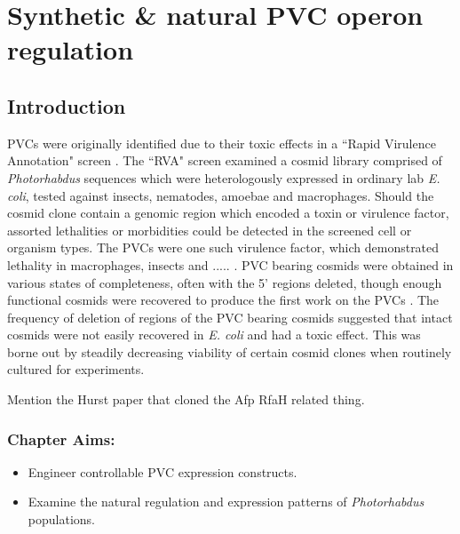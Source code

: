 \pagestyle{IHA-fancy-style}


\chapter{Synthetic \& natural PVC operon regulation}\label{regulation}

\section{Introduction}
PVCs were originally identified due to their toxic effects in a ``Rapid Virulence Annotation" screen \citep{Waterfield2008, Yang2006}. The ``RVA" screen examined a cosmid library comprised of \emph{Photorhabdus} sequences which were heterologously expressed in ordinary lab \emph{E. coli}, tested against insects, nematodes, amoebae and macrophages. Should the cosmid clone contain a genomic region which encoded a toxin or virulence factor, assorted lethalities or morbidities could be detected in the screened cell or organism types. The PVCs were one such virulence factor, which demonstrated lethality in macrophages, insects and ..... . PVC bearing cosmids were obtained in various states of completeness, often with the 5' regions deleted, though enough functional cosmids were recovered to produce the first work on the PVCs \citep{Yang2006}. The frequency of deletion of regions of the PVC bearing cosmids suggested that intact cosmids were not easily recovered in \emph{E. coli} and had a toxic effect. This was borne out by steadily decreasing viability of certain cosmid clones when routinely cultured for experiments.


Mention the Hurst paper that cloned the Afp RfaH related thing.



\subsection*{Chapter Aims:}
\begin{itemize}
	\item Engineer controllable PVC expression constructs.
	\item Examine the natural regulation and expression patterns of \emph{Photorhabdus} populations.
\end{itemize}
\clearpage




